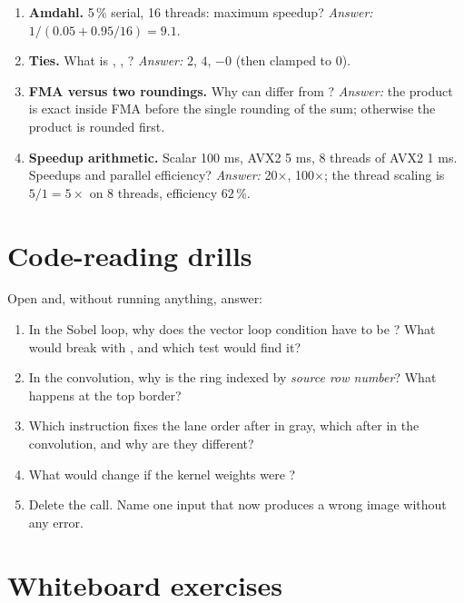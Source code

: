 \begin{enumerate}[leftmargin=*,itemsep=6pt]
\item \textbf{Amdahl.} 5\,\% serial, 16 threads: maximum speedup? \emph{Answer:} $1/(0.05+0.95/16)=9.1$.
\item \textbf{Ties.} What is , , ? \emph{Answer:} $2$, $4$, $-0$ (then clamped to 0).
\item \textbf{FMA versus two roundings.} Why can  differ from ? \emph{Answer:} the product is exact inside FMA before the single rounding of the sum; otherwise the product is rounded first.
\item \textbf{Speedup arithmetic.} Scalar 100 ms, AVX2 5 ms, 8 threads of AVX2 1 ms. Speedups and parallel efficiency? \emph{Answer:} 20$\times$, 100$\times$; the thread scaling is $5/1=5\times$ on 8 threads, efficiency $62\,\%$.
\end{enumerate}

\section{Code-reading drills}

Open  and, without running anything, answer:
\begin{enumerate}[leftmargin=*,itemsep=4pt]
\item In the Sobel loop, why does the vector loop condition have to be ? What would break with , and which test would find it?
\item In the convolution, why is the ring indexed by \emph{source row number}? What happens at the top border?
\item Which instruction fixes the lane order after  in gray, which after  in the convolution, and why are they different?
\item What would change if the kernel weights were ?
\item Delete the  call. Name one input that now produces a wrong image without any error.
\end{enumerate}

\section{Whiteboard exercises}

